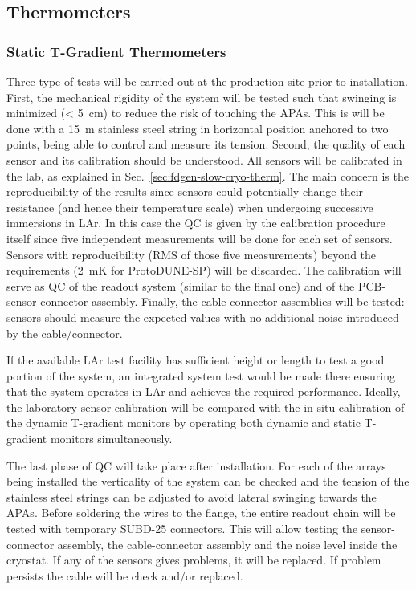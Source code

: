 \subsection{Thermometers}
\label{sec:fdgen-slow-cryo-qc-th}

\subsubsection{Static T-Gradient Thermometers}
\label{sec:fdgen-slow-cryo-qc-thst}


Three type of tests will be carried out at the production site prior to installation. First, the mechanical rigidity of the system will be tested such that swinging is minimized (< \SI{5}{cm})
to reduce the risk of touching the APAs. This is will be done with a \SI{15}{m} stainless steel string in horizontal position anchored to two points, being able to control and measure its tension. 
Second, the quality of each sensor and its calibration should be understood. All sensors will be calibrated in the lab, as explained in Sec.~\ref{sec:fdgen-slow-cryo-therm}.
The main concern is the reproducibility of the results since sensors could potentially change their resistance (and hence their temperature scale)
when undergoing successive immersions in LAr. In this case the QC is given by the calibration procedure itself since five independent measurements
will be done for each set of sensors. Sensors with reproducibility (RMS of those five measurements) beyond the requirements (\SI{2}{mK} for ProtoDUNE-SP) will be discarded.  
The calibration will serve as QC of the readout system (similar to the final one) and of the PCB-sensor-connector assembly. Finally, the cable-connector assemblies will
be tested: sensors should measure the expected values with no additional noise introduced by the cable/connector. 

If the available LAr test facility has sufficient height or length to test a good portion of the system, an integrated system test would be made there ensuring that the system
operates in LAr and achieves the required performance. Ideally, the laboratory sensor calibration will be compared with the in situ calibration
of the dynamic T-gradient monitors by operating both dynamic and static T-gradient monitors simultaneously.   

The last phase of QC will take place after installation. For each of the arrays being installed
the verticality of the system can be checked and the tension of the stainless steel strings can be adjusted to avoid lateral swinging towards the APAs. 
Before soldering the wires to the flange, the entire readout chain will be tested with temporary SUBD-25 connectors. 
This will allow testing the sensor-connector assembly, the cable-connector assembly and the noise level inside the cryostat.
If any of the sensors gives problems, it will be replaced. If problem persists the cable will be check and/or replaced.


